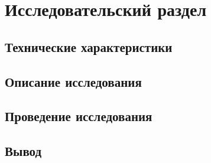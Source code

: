 \section{Исследовательский раздел}

\subsection{Технические характеристики}

\subsection{Описание исследования}

\subsection{Проведение исследования}

\subsection{Вывод}
